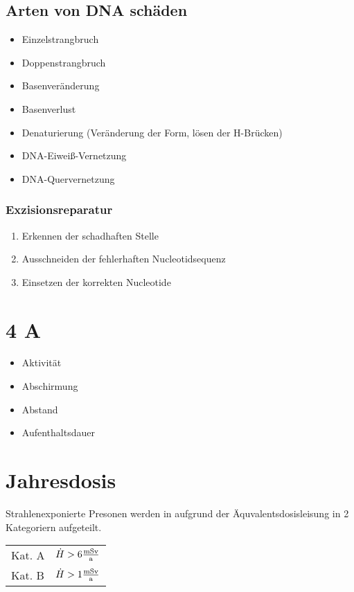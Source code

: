 \documentclass[12pt,a4paper,one side]{article}%
\begin{document}
\subsection{Arten von DNA schäden}
\begin{itemize}
\itemsep0pt
\item Einzelstrangbruch
\item Doppenstrangbruch
\item Basenveränderung
\item Basenverlust
\item Denaturierung (Veränderung der Form, lösen der H-Brücken)
\item DNA-Eiweiß-Vernetzung
\item DNA-Quervernetzung
\end{itemize}
\subsubsection*{\glqq Exzisionsreparatur \grqq}
\begin{enumerate}
\itemsep0pt
\item Erkennen der schadhaften Stelle
\item Ausschneiden der fehlerhaften Nucleotidsequenz
\item Einsetzen der korrekten Nucleotide
\end{enumerate}

\section{4 A}
\begin{itemize}
\itemsep0pt
\item Aktivität
\item Abschirmung
\item Abstand
\item Aufenthaltsdauer
\end{itemize}

\parbox{\textwidth}{%
\section{Jahresdosis}

Strahlenexponierte Presonen werden in aufgrund der Äquvalentsdosisleisung in 2 Kategoriern aufgeteilt.

\begin{tabular}{l l}
	Kat. A & $\dot{H} > 6 {\rm \frac{mSv}{a}}$ \\
	Kat. B & $\dot{H} > 1 {\rm \frac{mSv}{a}}$ \\
\end{tabular}
}
\end{document}
